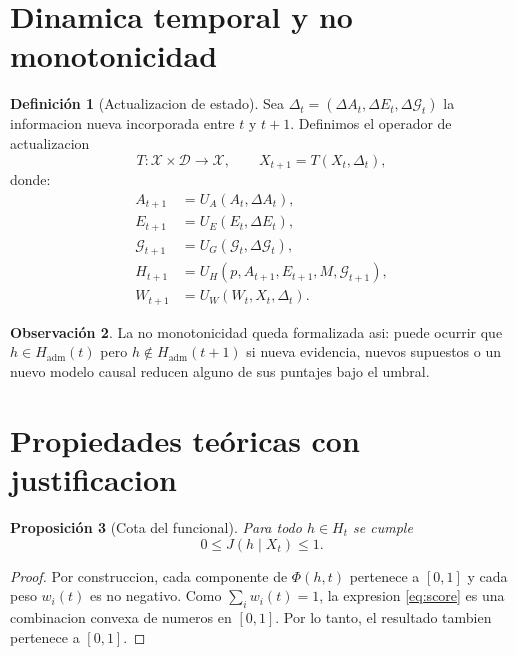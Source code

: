 \documentclass[12pt,a4paper]{article}
\theoremstyle{definition}
\newtheorem{definition}{Definici\'on}[section]
\newtheorem{remark}[definition]{Observaci\'on}
\theoremstyle{plain}
\newtheorem{proposition}[definition]{Proposici\'on}
\theoremstyle{remark}
\begin{document}
\section{Dinamica temporal y no monotonicidad}


\begin{definition}[Actualizacion de estado]
Sea $\Delta_t=(\Delta A_t,\Delta E_t,\Delta \mathcal{G}_t)$ la informacion nueva incorporada entre $t$ y $t+1$. Definimos el operador de actualizacion
\begin{equation}
T:\mathcal{X}\times\mathcal{D}\to\mathcal{X},
\qquad
X_{t+1}=T(X_t,\Delta_t),
\end{equation}
donde:
\begin{align}
A_{t+1} &= U_A(A_t,\Delta A_t),\\
E_{t+1} &= U_E(E_t,\Delta E_t),\\
\mathcal{G}_{t+1} &= U_G(\mathcal{G}_t,\Delta \mathcal{G}_t),\\
H_{t+1} &= U_H(p,A_{t+1},E_{t+1},M,\mathcal{G}_{t+1}),\\
W_{t+1} &= U_W(W_t, X_t, \Delta_t).
\end{align}
\end{definition}

\begin{remark}
La no monotonicidad queda formalizada asi: puede ocurrir que $h\in H_{\mathrm{adm}}(t)$ pero $h\notin H_{\mathrm{adm}}(t+1)$ si nueva evidencia, nuevos supuestos o un nuevo modelo causal reducen alguno de sus puntajes bajo el umbral.
\end{remark}

\section{Propiedades te\'oricas con justificacion}

\begin{proposition}[Cota del funcional]
Para todo $h\in H_t$ se cumple
\begin{equation}
0\le J(h\mid X_t)\le 1.
\end{equation}
\end{proposition}

\begin{proof}
Por construccion, cada componente de $\Phi(h,t)$ pertenece a $[0,1]$ y cada peso $w_i(t)$ es no negativo. Como $\sum_i w_i(t)=1$, la expresion \eqref{eq:score} es una combinacion convexa de numeros en $[0,1]$. Por lo tanto, el resultado tambien pertenece a $[0,1]$.
\end{proof}
\end{document}
